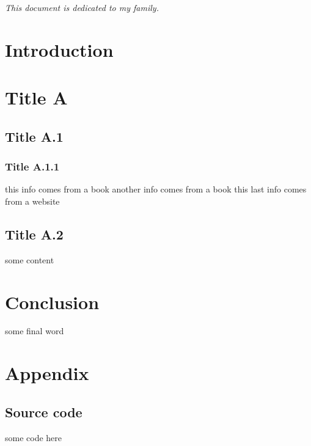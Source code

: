 \documentclass{article}
\begin{document}

\newpage\null\thispagestyle{empty}
\newpage

\vspace*{5cm}
\textit{\LARGE This document is dedicated to my family.}
\newpage

\tableofcontents
\newpage

\section{Introduction}

\section{Title A}

\subsection{Title A.1}

\subsubsection{Title A.1.1}

this info comes from a book \cite{AlgorithmsForClustering} \newline
another info comes from a book \cite{IntroductionToDataMining} \newline
this last info comes from a website \cite{PythonWebsite}

\subsection{Title A.2}

some content

\section{Conclusion}

some final word

\cleardoublepage

\newpage

\appendix
\section*{Appendix}
\renewcommand{\thesubsection}{\Alph{subsection}}

\subsection{Source code}
\label{Source code}

some code here
\end{document}
